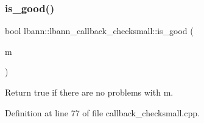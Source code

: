 \subsubsection{\texorpdfstring{is\+\_\+good()}{is\_good()}}
{\footnotesize\ttfamily bool lbann\+::lbann\+\_\+callback\+\_\+checksmall\+::is\+\_\+good (\begin{DoxyParamCaption}\item[{const \hyperlink{base_8hpp_a9a697a504ae84010e7439ffec862b470}{Abs\+Dist\+Mat} \&}]{m }\end{DoxyParamCaption})\hspace{0.3cm}{\ttfamily [private]}}

Return true if there are no problems with m. 

Definition at line 77 of file callback\+\_\+checksmall.\+cpp.


